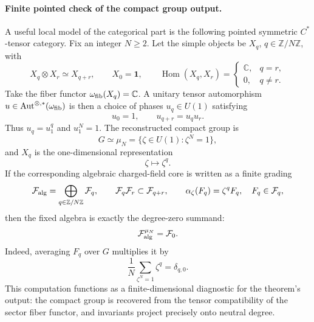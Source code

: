 \paragraph{Finite pointed check of the compact group output.}
A useful local model of the categorical part is the following pointed
symmetric \(C^*\)-tensor category.  Fix an integer \(N\geq2\).  Let the simple
objects be \(X_q\), \(q\in\mathbb Z/N\mathbb Z\), with
\[
  X_q\otimes X_r\simeq X_{q+r},
  \qquad
  X_0=\mathbf 1,
  \qquad
  \operatorname{Hom}(X_q,X_r)=
  \begin{cases}
    \mathbb C, & q=r,\\
    0, & q\ne r .
  \end{cases}
\]
Take the fiber functor \(\omega_{\rm fib}(X_q)=\mathbb C\).  A unitary tensor
automorphism \(u\in\operatorname{Aut}^{\otimes,*}(\omega_{\rm fib})\) is then a
choice of phases \(u_q\in U(1)\) satisfying
\[
  u_0=1,
  \qquad
  u_{q+r}=u_q u_r .
\]
Thus \(u_q=u_1^q\) and \(u_1^N=1\).  The reconstructed compact group is
\begin{equation}
  G\simeq \mu_N=\{\zeta\in U(1):\zeta^N=1\},
  \label{eq:dr-pointed-zn-reconstructed-group}
\end{equation}
and \(X_q\) is the one-dimensional representation
\[
  \zeta\longmapsto \zeta^q .
\]
If the corresponding algebraic charged-field core is written as a finite
grading
\begin{equation}
  \mathcal F_{\rm alg}
  =
  \bigoplus_{q\in\mathbb Z/N\mathbb Z}\mathcal F_q,
  \qquad
  \mathcal F_q\mathcal F_r\subset \mathcal F_{q+r},
  \qquad
  \alpha_\zeta(F_q)=\zeta^q F_q,
  \quad F_q\in\mathcal F_q ,
  \label{eq:dr-pointed-zn-field-grading}
\end{equation}
then the fixed algebra is exactly the degree-zero summand:
\begin{equation}
  \mathcal F_{\rm alg}^{\mu_N}=\mathcal F_0 .
  \label{eq:dr-pointed-zn-fixed-algebra}
\end{equation}
Indeed, averaging \(F_q\) over \(G\) multiplies it by
\[
  \frac1N\sum_{\zeta^N=1}\zeta^q
  =
  \delta_{q,0}.
\]
This computation functions as a finite-dimensional diagnostic for the theorem's
output: the compact group is recovered from the tensor compatibility of the
sector fiber functor, and invariants project precisely onto neutral degree.

